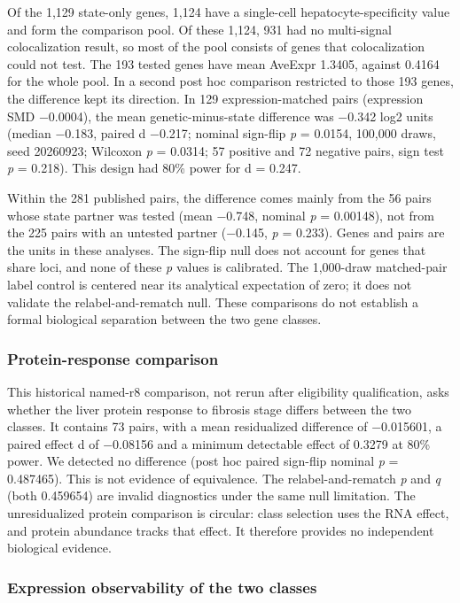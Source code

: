Of the 1,129 state-only genes, 1,124 have a single-cell hepatocyte-specificity value and form the comparison pool. Of these 1,124, 931 had no multi-signal colocalization result, so most of the pool consists of genes that colocalization could not test. The 193 tested genes have mean AveExpr 1.3405, against 0.4164 for the whole pool. In a second post hoc comparison restricted to those 193 genes, the difference kept its direction. In 129 expression-matched pairs (expression SMD −0.0004), the mean genetic-minus-state difference was −0.342 log2 units (median −0.183, paired d −0.217; nominal sign-flip \emph{p} = 0.0154, 100,000 draws, seed 20260923; Wilcoxon \emph{p} = 0.0314; 57 positive and 72 negative pairs, sign test \emph{p} = 0.218). This design had 80\% power for d = 0.247.

Within the 281 published pairs, the difference comes mainly from the 56 pairs whose state partner was tested (mean −0.748, nominal \emph{p} = 0.00148), not from the 225 pairs with an untested partner (−0.145, \emph{p} = 0.233). Genes and pairs are the units in these analyses. The sign-flip null does not account for genes that share loci, and none of these \emph{p} values is calibrated. The 1,000-draw matched-pair label control is centered near its analytical expectation of zero; it does not validate the relabel-and-rematch null. These comparisons do not establish a formal biological separation between the two gene classes.

\subsubsection{Protein-response comparison}\label{protein-response-comparison}

This historical named-r8 comparison, not rerun after eligibility qualification, asks whether the liver protein response to fibrosis stage differs between the two classes. It contains 73 pairs, with a mean residualized difference of −0.015601, a paired effect d of −0.08156 and a minimum detectable effect of 0.3279 at 80\% power. We detected no difference (post hoc paired sign-flip nominal \emph{p} = 0.487465). This is not evidence of equivalence. The relabel-and-rematch \emph{p} and \emph{q} (both 0.459654) are invalid diagnostics under the same null limitation. The unresidualized protein comparison is circular: class selection uses the RNA effect, and protein abundance tracks that effect. It therefore provides no independent biological evidence.

\subsubsection{Expression observability of the two classes}\label{expression-observability-of-the-two-classes}

